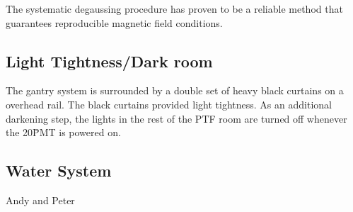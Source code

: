 The systematic degaussing procedure has proven to be a reliable method that guarantees reproducible magnetic field conditions. 















\subsection{Light Tightness/Dark room}

The gantry system is surrounded by a double set of heavy black
curtains on a overhead rail.  The black curtains provided light tightness.
As an additional darkening step, the lights in the rest of the PTF room
are turned off whenever the 20\" PMT is powered on.


\subsection{Water System}
Andy and Peter


